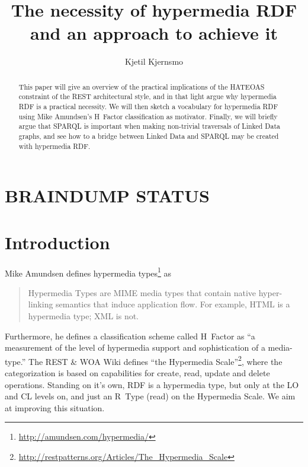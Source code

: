 \documentclass{llncs}
\title{The necessity of hypermedia RDF and an approach to achieve it}
\author{Kjetil Kjernsmo\inst{1}}
\institute{Department of Informatics,
Postboks 1080 Blindern,
0316 Oslo, Norway
\email{kjekje@ifi.uio.no}}
\begin{document}
\maketitle



\begin{abstract}
This paper will give an overview of the practical implications of the
HATEOAS constraint of the REST architectural style, and in that light argue why
hypermedia RDF is a practical necessity. We will then sketch a
vocabulary for hypermedia RDF using Mike Amundsen's H~Factor
classification as motivator. Finally, we will briefly argue that
SPARQL is important when making non-trivial traversals of Linked Data
graphs, and see how to a bridge between Linked Data and SPARQL may be
created with hypermedia RDF.
\end{abstract}

\section*{BRAINDUMP STATUS}

\section{Introduction}


Mike Amundsen defines hypermedia types\footnote{\url{http://amundsen.com/hypermedia/}} as 
\begin{quote}
Hypermedia Types are MIME media types that contain native
hyper-linking semantics that induce application flow. For example,
HTML is a hypermedia type; XML is not.
\end{quote}
Furthermore, he defines a classification scheme called H~Factor as ``a
measurement of the level of hypermedia support and sophistication of a
media-type.'' The REST & WOA Wiki defines ``the Hypermedia
Scale''\footnote{\url{http://restpatterns.org/Articles/The_Hypermedia_Scale}},
where the categorization is based on capabilities for create, read,
update and delete operations.  Standing on it's own, RDF is a
hypermedia type, but only at the \textsf{LO} and \textsf{CL} levels
on, and just an R~Type (read) on the Hypermedia Scale. We aim at improving
this situation.
\end{document}
